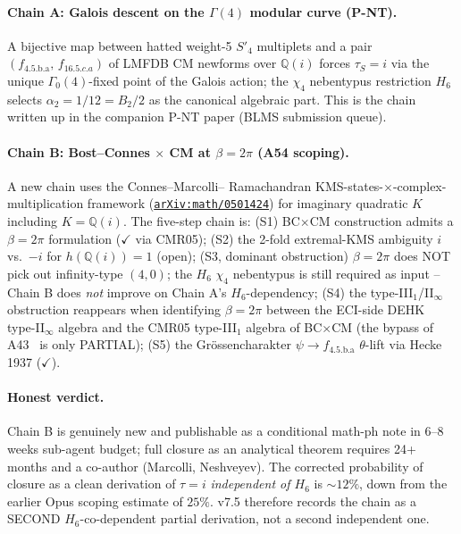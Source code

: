 \documentclass[a4paper,11pt]{article}
\newcommand{\Spf}{S'_4}
\newcommand{\arXiv}[1]{\href{https://arxiv.org/abs/#1}{\texttt{arXiv:#1}}}
\newcommand{\fLM}{f_{\text{4.5.b.a}}}
\newcommand{\Qi}{\mathbb{Q}(i)}
\theoremstyle{definition}
\theoremstyle{remark}
\begin{document}
\paragraph{Chain A: Galois descent on the $\Gamma(4)$ modular
curve (P-NT).}  A bijective map between hatted weight-5 $\Spf$
multiplets and a pair $(\fLM,\,f_{16.5.c.a})$ of LMFDB CM
newforms over $\Qi$ \cite{ECIv6053} forces $\tau_S=i$ via the
unique $\Gamma_0(4)$-fixed point of the Galois action; the
$\chi_4$ nebentypus restriction $H_6$ selects $\alpha_2=1/12=
B_2/2$ as the canonical algebraic part.  This is the chain
written up in the companion P-NT paper (BLMS submission queue).

\paragraph{Chain B: Bost--Connes $\times$ CM at $\beta=2\pi$
(A54 scoping).}  A new chain uses the Connes--Marcolli--%
Ramachandran KMS-states-$\times$-complex-multiplication
framework \cite{CMR05} (\arXiv{math/0501424}) for imaginary
quadratic $K$ including $K=\Qi$.  The five-step chain is:
(S1) BC$\times$CM construction admits a $\beta=2\pi$
formulation ($\checkmark$ via CMR05);
(S2) the 2-fold extremal-KMS ambiguity $i$ vs.\ $-i$ for
$h(\Qi)=1$ (open);
(S3, dominant obstruction) $\beta=2\pi$ does NOT pick out
infinity-type $(4,0)$; the $H_6$ $\chi_4$ nebentypus is still
required as input -- Chain B does \emph{not} improve on
Chain A's $H_6$-dependency;
(S4) the type-III${}_1$/II${}_\infty$ obstruction reappears
when identifying $\beta=2\pi$ between the ECI-side
DEHK~\cite{DEHK} type-II$_\infty$ algebra and the CMR05
type-III${}_1$ algebra of BC$\times$CM (the bypass of
A43~\cite{A43audit} is only PARTIAL);
(S5) the Gr\"ossencharakter $\psi\to\fLM$ $\theta$-lift via
Hecke 1937 ($\checkmark$).

\paragraph{Honest verdict.}  Chain B is genuinely new and
publishable as a conditional math-ph note in 6--8 weeks
sub-agent budget; full closure as an analytical theorem
requires 24+ months and a co-author (Marcolli, Neshveyev).
The corrected probability of closure as a clean derivation of
$\tau=i$ \emph{independent of $H_6$} is $\sim 12\%$, down from
the earlier Opus scoping estimate of $25\%$.  v7.5 therefore
records the chain as a SECOND $H_6$-co-dependent partial
derivation, not a second independent one.
\end{document}
